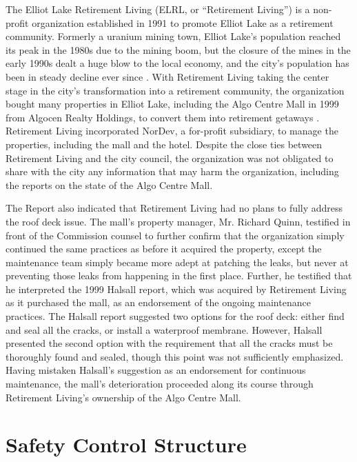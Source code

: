 \documentclass[12pt]{article}
\begin{document}
The Elliot Lake Retirement Living (ELRL, or ``Retirement Living'') is a non-profit organization established in 1991 to promote Elliot Lake as a retirement community. Formerly a uranium mining town, Elliot Lake's population reached its peak in the 1980s due to the mining boom, but the closure of the mines in the early 1990s dealt a huge blow to the local economy, and the city's population has been in steady decline ever since \cite{ElliotLakePopulation}. With Retirement Living taking the center stage in the city's transformation into a retirement community, the organization bought many properties in Elliot Lake, including the Algo Centre Mall in 1999 from Algocen Realty Holdings, to convert them into retirement getaways \cite{NYT1996}. Retirement Living incorporated NorDev, a for-profit subsidiary, to manage the properties, including the mall and the hotel. Despite the close ties between Retirement Living and the city council, the organization was not obligated to share with the city any information that may harm the organization, including the reports on the state of the Algo Centre Mall. 

The Report also indicated that Retirement Living had no plans to fully address the roof deck issue. The mall's property manager, Mr. Richard Quinn, testified in front of the Commission counsel to further confirm that the organization simply continued the same practices as before it acquired the property, except the maintenance team simply became more adept at patching the leaks, but never at preventing those leaks from happening in the first place. Further, he testified that he interpreted the 1999 Halsall report, which was acquired by Retirement Living as it purchased the mall, as an endorsement of the ongoing maintenance practices. The Halsall report suggested two options for the roof deck: either find and seal all the cracks, or install a waterproof membrane. However, Halsall presented the second option with the requirement that all the cracks must be thoroughly found and sealed, though this point was not sufficiently emphasized. Having mistaken Halsall's suggestion as an endorsement for continuous maintenance, the mall's deterioration proceeded along its course through Retirement Living's ownership of the Algo Centre Mall. 



\section{Safety Control Structure}
\end{document}
